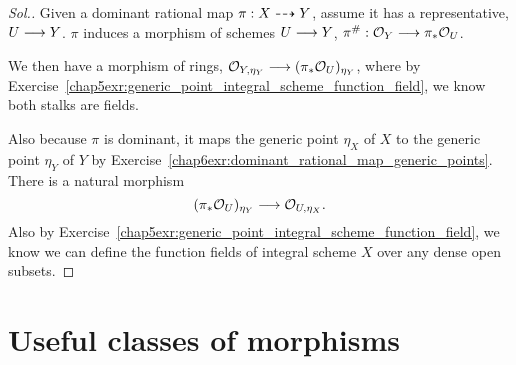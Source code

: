 \documentclass[11pt]{book} %
\begin{document}
\begin{proof}[Sol.]
Given a dominant rational map $\pi:X\dashrightarrow Y$, assume it has a representative, $U\longrightarrow Y$. $\pi$ induces a morphism of schemes $U\longrightarrow Y$, $\pi^\#:{\cal O}_Y\longrightarrow \pi_*{\cal O}_U$.

We then have a morphism of rings, ${\cal O}_{Y,\eta_Y}\longrightarrow (\pi_*{\cal O}_{U})_{\eta_Y}$, where by Exercise~\ref{chap5exr:generic_point_integral_scheme_function_field}, we know both stalks are fields.

Also because $\pi$ is dominant, it maps the generic point $\eta_X$ of $X$ to the generic point $\eta_Y$ of $Y$ by Exercise~\ref{chap6exr:dominant_rational_map_generic_points}. There is a natural morphism
$$
(\pi_*{\cal O}_{U})_{\eta_Y}\longrightarrow{\cal O}_{U,\eta_X}.
$$
Also by Exercise~\ref{chap5exr:generic_point_integral_scheme_function_field}, we know we can define the function fields of integral scheme $X$ over any dense open subsets.
\end{proof}
\chapter{Useful classes of morphisms}
\end{document}
